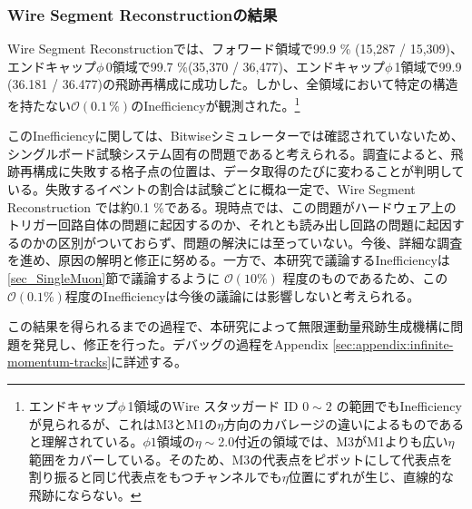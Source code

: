 \subsubsection*{Wire Segment Reconstructionの結果}
Wire Segment Reconstructionでは、フォワード領域で99.9 \% (15,287 / 15,309)、エンドキャップ$\phi\,$0領域で99.7 \%(35,370 / 36,477)、エンドキャップ$\phi\,$1領域で99.9 (36.181 / 36.477)の飛跡再構成に成功した。しかし、全領域において特定の構造を持たない$\mathcal{O}(0.1\,\%)$のInefficiencyが観測された。\footnote{エンドキャップ$\phi\,$1領域のWire スタッガード ID $0 \sim 2$ の範囲でもInefficiencyが見られるが、これはM3とM1の$\eta$方向のカバレージの違いによるものであると理解されている。$\phi1$領域の$\eta\sim$2.0付近の領域では、M3がM1よりも広い$\eta$範囲をカバーしている。そのため、M3の代表点をピボットにして代表点を割り振ると同じ代表点をもつチャンネルでも$\eta$位置にずれが生じ、直線的な飛跡にならない。
}

このInefficiencyに関しては、Bitwiseシミュレーターでは確認されていないため、シングルボード試験システム固有の問題であると考えられる。調査によると、飛跡再構成に失敗する格子点の位置は、データ取得のたびに変わることが判明している。失敗するイベントの割合は試験ごとに概ね一定で、Wire Segment Reconstruction では約0.1 \%である。現時点では、この問題がハードウェア上のトリガー回路自体の問題に起因するのか、それとも読み出し回路の問題に起因するのかの区別がついておらず、問題の解決には至っていない。今後、詳細な調査を進め、原因の解明と修正に努める。一方で、本研究で議論するInefficiencyは\ref{sec_SingleMuon}節で議論するように $\mathcal{O}(10 \%)$ 程度のものであるため、この$\mathcal{O}(0.1 \%)$程度のInefficiencyは今後の議論には影響しないと考えられる。

この結果を得られるまでの過程で、本研究によって無限運動量飛跡生成機構に問題を発見し、修正を行った。デバッグの過程をAppendix \ref{sec:appendix:infinite-momentum-tracks}に詳述する。

